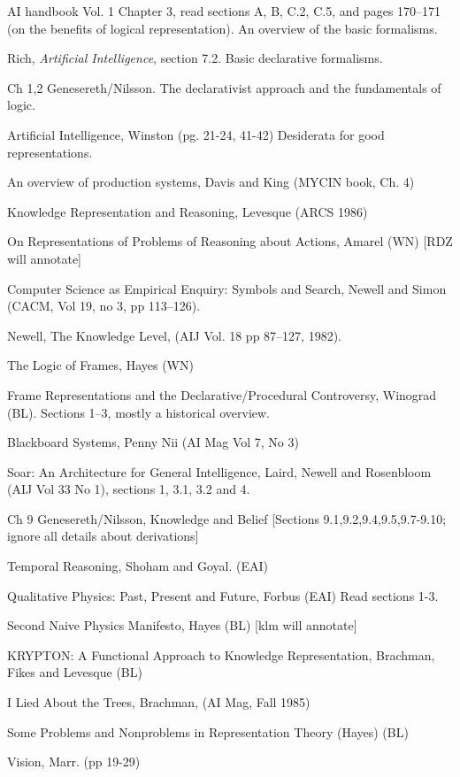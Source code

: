 \begin{required}

  \paper AI handbook Vol. 1 Chapter 3, read sections A, B, C.2, C.5,
and pages 170--171 (on the benefits of logical representation).  An
overview of the basic formalisms.

\paper Rich, {\em Artificial Intelligence}, section 7.2.  Basic declarative
formalisms.

  \paper Ch 1,2 Genesereth/Nilsson.  The declarativist approach and
the fundamentals of logic.

  \paper  Artificial Intelligence, Winston (pg. 21-24, 41-42)
     Desiderata for good representations.

  \paper  An overview of production systems, Davis and King (MYCIN book, Ch. 4)

  \paper Knowledge Representation and Reasoning, Levesque (ARCS 1986)

  \paper On Representations of Problems of Reasoning about Actions,
Amarel (WN) [RDZ will annotate]

  \paper Computer Science as Empirical Enquiry: Symbols and Search,
Newell and Simon (CACM, Vol 19, no 3, pp 113--126).

  \paper Newell, The Knowledge Level, (AIJ Vol. 18 pp 87--127, 1982).

  \paper  The Logic of Frames, Hayes (WN) 

  \paper Frame Representations and the Declarative/Procedural
Controversy, Winograd (BL).  Sections 1--3, mostly a historical
overview.

  \paper  Blackboard Systems, Penny Nii (AI Mag Vol 7, No 3)

  \paper  Soar: An Architecture for General Intelligence, Laird, Newell and
Rosenbloom (AIJ Vol 33  No 1), sections 1, 3.1, 3.2 and 4.

  \paper  Ch 9  Genesereth/Nilsson, Knowledge and Belief
     [Sections 9.1,9.2,9.4,9.5,9.7-9.10; ignore all details about derivations]

  \paper  Temporal Reasoning, Shoham and Goyal. (EAI)

  \paper  Qualitative Physics: Past, Present and Future, Forbus (EAI)
Read sections 1-3.

  \paper  Second Naive Physics Manifesto, Hayes (BL) [klm will annotate]

\end{required}

\begin{optional}

  \paper  KRYPTON: A Functional Approach to Knowledge Representation,
        Brachman, Fikes and Levesque (BL) 

  \paper  I Lied About the Trees, Brachman, (AI Mag, Fall 1985)

  \paper  Some Problems and Nonproblems in Representation Theory (Hayes) (BL)

  \paper  Vision, Marr. (pp 19-29)

\end{optional}

